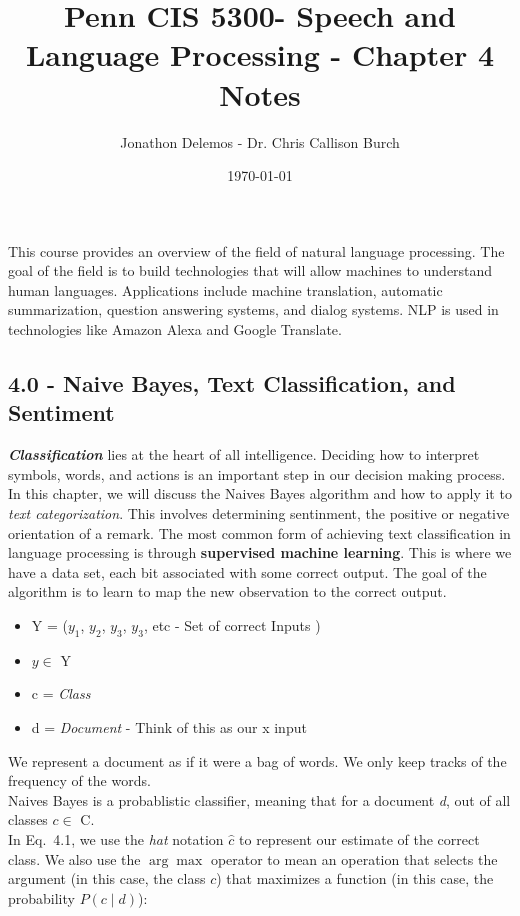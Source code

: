 \documentclass{article}
\title{Penn CIS 5300- Speech and Language Processing - Chapter 4 Notes}
\author{Jonathon Delemos - Dr. Chris Callison Burch}
\date{\today}
\begin{document}
\maketitle

This course provides an overview of the field of natural language processing. The goal of
the field is to build technologies that will allow machines to understand human languages.
Applications include machine translation, automatic summarization, question answering
systems, and dialog systems. NLP is used in technologies like Amazon Alexa and Google
Translate.

\subsection{4.0 - Naive Bayes, Text Classification, and Sentiment}
\textbf{\textit{Classification}} lies at the heart of all intelligence. Deciding how to interpret symbols, words, and actions is an important step in our decision making process.
In this chapter, we will discuss the Naives Bayes algorithm and how to apply it to \textit{text categorization}.
This involves determining sentinment, the positive or negative orientation of a remark.
The most common form of achieving text classification in language processing is through \textbf{supervised machine learning}.
This is where we have a data set, each bit associated with some correct output. The goal of the algorithm is to learn to map
the new observation to the correct output.
\begin{itemize}
    \item Y = ($y_1$, $y_2$, $y_3$, $y_3$, etc - Set of correct Inputs )
    \item $y \in $ Y
    \item c = \textit{Class}
    \item d = \textit{Document} - Think of this as our x input
\end{itemize}
We represent a document as if it were a bag of words. We only keep tracks of the frequency of the words.
\\Naives Bayes is a probablistic classifier, meaning that for a document \textit{d}, out of all classes
$c \in $ C.
\\
In Eq.~4.1, we use the \emph{hat} notation $\hat{c}$ to represent our estimate of the correct class.
We also use the $\arg\max$ operator to mean an operation that selects the argument (in this case, the class $c$)
that maximizes a function (in this case, the probability $P(c \mid d)$):
\end{document}
